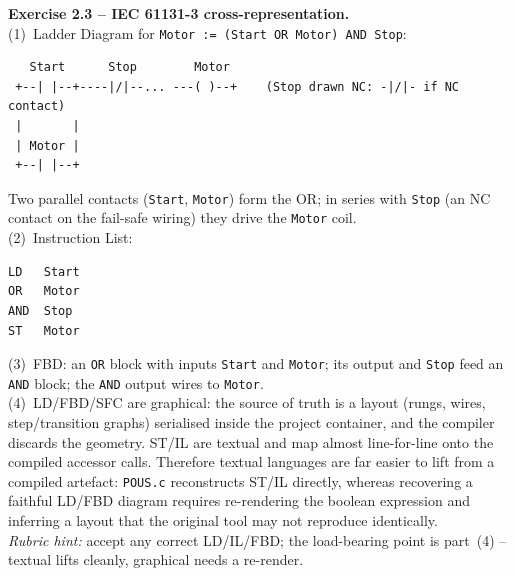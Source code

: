 \documentclass[11pt,a4paper]{article}
\begin{document}
\begin{solutionbox}
\textbf{Exercise 2.3 -- IEC 61131-3 cross-representation.}\\[2pt]
(1)~Ladder Diagram for \texttt{Motor := (Start OR Motor) AND Stop}:
\begin{lstlisting}
   Start      Stop        Motor
 +--| |--+----|/|--... ---( )--+    (Stop drawn NC: -|/|- if NC contact)
 |       |
 | Motor |
 +--| |--+
\end{lstlisting}
Two parallel contacts (\texttt{Start}, \texttt{Motor}) form the OR; in series with \texttt{Stop}
(an NC contact on the fail-safe wiring) they drive the \texttt{Motor} coil.\\
(2)~Instruction List:
\begin{lstlisting}
LD   Start
OR   Motor
AND  Stop
ST   Motor
\end{lstlisting}
(3)~FBD: an \texttt{OR} block with inputs \texttt{Start} and \texttt{Motor}; its output and
\texttt{Stop} feed an \texttt{AND} block; the \texttt{AND} output wires to \texttt{Motor}.\\
(4)~LD/FBD/SFC are graphical: the source of truth is a layout (rungs, wires, step/transition
graphs) serialised inside the project container, and the compiler discards the geometry. ST/IL are
textual and map almost line-for-line onto the compiled accessor calls. Therefore textual languages
are far easier to lift from a compiled artefact: \texttt{POUS.c} reconstructs ST/IL directly,
whereas recovering a faithful LD/FBD diagram requires re-rendering the boolean expression and
inferring a layout that the original tool may not reproduce identically.\\[2pt]
\emph{Rubric hint:} accept any correct LD/IL/FBD; the load-bearing point is part~(4) -- textual
lifts cleanly, graphical needs a re-render.
\end{solutionbox}
\end{document}
